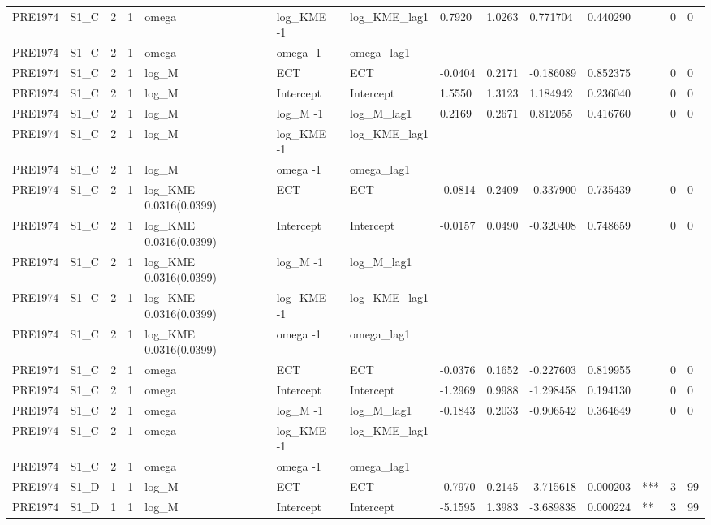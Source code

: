 \begin{tabular}{llllllllllllll}
PRE1974 & S1\_C & 2 & 1 & omega & log\_KME -1 & log\_KME\_lag1 & 0.7920 & 1.0263 & 0.771704 & 0.440290 &  & 0 & 0 \\
PRE1974 & S1\_C & 2 & 1 & omega & omega -1 & omega\_lag1 &  &  &  &  &  &  &  \\
PRE1974 & S1\_C & 2 & 1 & log\_M & ECT & ECT & -0.0404 & 0.2171 & -0.186089 & 0.852375 &  & 0 & 0 \\
PRE1974 & S1\_C & 2 & 1 & log\_M & Intercept & Intercept & 1.5550 & 1.3123 & 1.184942 & 0.236040 &  & 0 & 0 \\
PRE1974 & S1\_C & 2 & 1 & log\_M & log\_M -1 & log\_M\_lag1 & 0.2169 & 0.2671 & 0.812055 & 0.416760 &  & 0 & 0 \\
PRE1974 & S1\_C & 2 & 1 & log\_M & log\_KME -1 & log\_KME\_lag1 &  &  &  &  &  &  &  \\
PRE1974 & S1\_C & 2 & 1 & log\_M & omega -1 & omega\_lag1 &  &  &  &  &  &  &  \\
PRE1974 & S1\_C & 2 & 1 & log\_KME 0.0316(0.0399) & ECT & ECT & -0.0814 & 0.2409 & -0.337900 & 0.735439 &  & 0 & 0 \\
PRE1974 & S1\_C & 2 & 1 & log\_KME 0.0316(0.0399) & Intercept & Intercept & -0.0157 & 0.0490 & -0.320408 & 0.748659 &  & 0 & 0 \\
PRE1974 & S1\_C & 2 & 1 & log\_KME 0.0316(0.0399) & log\_M -1 & log\_M\_lag1 &  &  &  &  &  &  &  \\
PRE1974 & S1\_C & 2 & 1 & log\_KME 0.0316(0.0399) & log\_KME -1 & log\_KME\_lag1 &  &  &  &  &  &  &  \\
PRE1974 & S1\_C & 2 & 1 & log\_KME 0.0316(0.0399) & omega -1 & omega\_lag1 &  &  &  &  &  &  &  \\
PRE1974 & S1\_C & 2 & 1 & omega & ECT & ECT & -0.0376 & 0.1652 & -0.227603 & 0.819955 &  & 0 & 0 \\
PRE1974 & S1\_C & 2 & 1 & omega & Intercept & Intercept & -1.2969 & 0.9988 & -1.298458 & 0.194130 &  & 0 & 0 \\
PRE1974 & S1\_C & 2 & 1 & omega & log\_M -1 & log\_M\_lag1 & -0.1843 & 0.2033 & -0.906542 & 0.364649 &  & 0 & 0 \\
PRE1974 & S1\_C & 2 & 1 & omega & log\_KME -1 & log\_KME\_lag1 &  &  &  &  &  &  &  \\
PRE1974 & S1\_C & 2 & 1 & omega & omega -1 & omega\_lag1 &  &  &  &  &  &  &  \\
PRE1974 & S1\_D & 1 & 1 & log\_M & ECT & ECT & -0.7970 & 0.2145 & -3.715618 & 0.000203 & *** & 3 & 99 \\
PRE1974 & S1\_D & 1 & 1 & log\_M & Intercept & Intercept & -5.1595 & 1.3983 & -3.689838 & 0.000224 & ** & 3 & 99 \\

\end{tabular}
